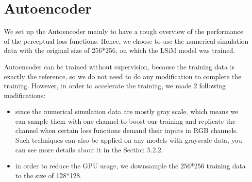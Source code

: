 \documentclass[a4paper,12pt,twoside]{report}
\begin{document}
\section{Autoencoder}
We set up the Autoencoder mainly to have a rough overview of the performance of the perceptual loss functions. Hence, we choose to use the numerical simulation data with the original size of 256*256, on which the LSiM model was trained. 

Autoencoder can be trained without supervision, because the training data is exactly the reference, so we do not need to do any modification to complete the training. However, in order to accelerate the training, we made 2 following modifications:
\begin{itemize}
\item since the numerical simulation data are mostly gray scale, which means we can sample them with one channel to boost our training and replicate the channel when certain loss functions demand their inputs in RGB channels. Such techniques can also be applied on any models with grayscale data, you can see more details about it in the Section 5.2.2.
\item in order to reduce the GPU usage, we downsample the 256*256 training data to the size of 128*128.

\end{itemize}
\end{document}
